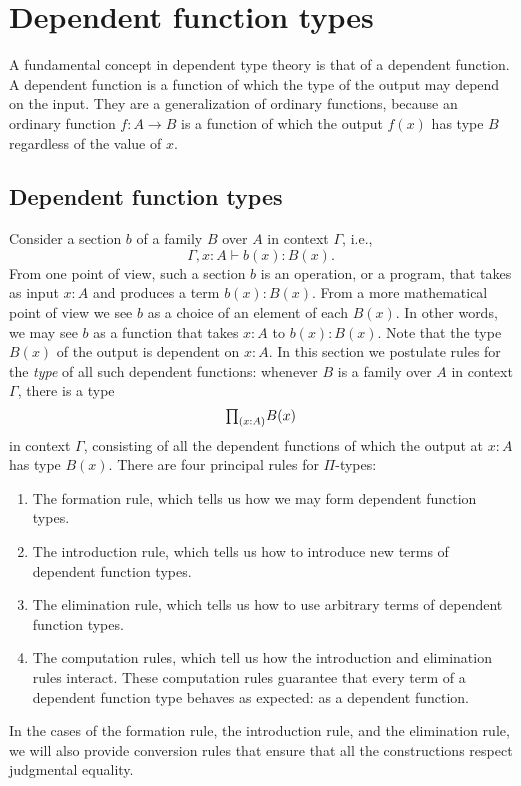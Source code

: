 \section{Dependent function types}
\label{ch:pi}

A fundamental concept in dependent type theory is that of a dependent function. A dependent function is a function of which the type of the output may depend on the input. They are a generalization of ordinary functions, because an ordinary function $f:A\to B$ is a function of which the output $f(x)$ has type $B$ regardless of the value of $x$.

\subsection{Dependent function types}
Consider a section $b$ of a family $B$ over $A$ in context $\Gamma$, i.e.,
\begin{equation*}
  \Gamma,x:A\vdash b(x):B(x).
\end{equation*}
From one point of view, such a section $b$ is an operation, or a program, that takes as input $x:A$ and produces a term $b(x):B(x)$. From a more mathematical point of view we see $b$ as a choice of an element of each $B(x)$. In other words, we may see $b$ as a function that takes $x:A$ to $b(x):B(x)$. Note that the type $B(x)$ of the output is dependent on $x:A$. In this section we postulate rules for the \emph{type} of all such dependent functions: whenever $B$ is a family over $A$ in context $\Gamma$, there is a type
\begin{equation*}
  \prd{x:A}B(x)
\end{equation*}
in context $\Gamma$, consisting of all the dependent functions of which the output at $x:A$ has type $B(x)$. There are four principal rules for $\Pi$-types:
\begin{enumerate}
\item The formation rule, which tells us how we may form dependent function types.
\item The introduction rule, which tells us how to introduce new terms of dependent function types.
\item The elimination rule, which tells us how to use arbitrary terms of dependent function types.
\item The computation rules, which tell us how the introduction and elimination rules interact. These computation rules guarantee that every term of a dependent function type behaves as expected: as a dependent function.
\end{enumerate}
In the cases of the formation rule, the introduction rule, and the elimination rule, we will also provide conversion rules that ensure that all the constructions respect judgmental equality.

